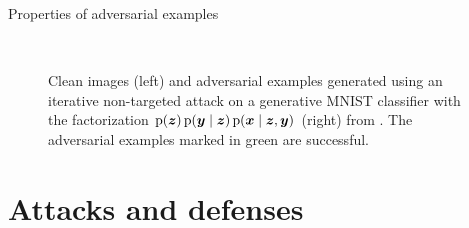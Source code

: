 \documentclass{beamer}
\newcommand{\citet}[1]{{\color{citecolor}\relscale{0.8}\textcite{#1}}}
\begin{document}
\begin{frame}[allowframebreaks=0.9]{Properties of adversarial examples}
\begin{figure}
	\begin{center}
		\
	\end{center}
	\caption{Clean images (left) and adversarial examples generated using an iterative non-targeted attack on a generative MNIST classifier with the factorization $\operatorname{\mathrm{p}}(\boldsymbol{z})\operatorname{\mathrm{p}}(\boldsymbol{y}\mid\boldsymbol{z})\operatorname{\mathrm{p}}(\boldsymbol{x}\mid\boldsymbol{z},\boldsymbol{y})$ (right) from \citet{Li:2019:AGCMRAA}. The adversarial examples marked in green are successful.}
	\label{fig:li-gfz-adversarial-examples-mnist}
\end{figure}
\end{frame}


\section{Attacks and defenses}
\end{document}
